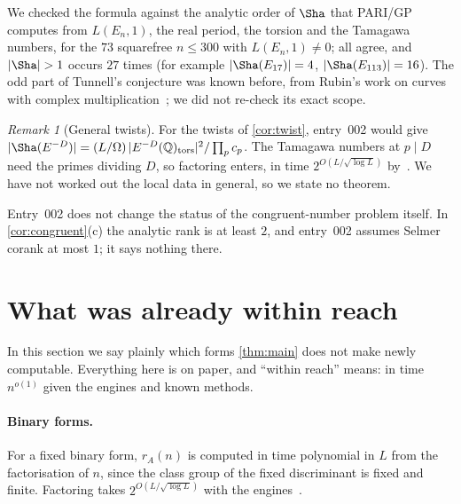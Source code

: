 \documentclass[10pt]{amsart}
\theoremstyle{plain}
\theoremstyle{definition}
\theoremstyle{remark}
\newtheorem{remark}[theorem]{Remark}
\numberwithin{equation}{section}
\newcommand{\Q}{\mathbb{Q}}
\newcommand{\rate}{2^{O(L/\sqrt{\log L})}}
\newcommand{\nr}{\dag}%
\begin{document}
\noindent We checked the formula against the analytic order of $\Sha$ that PARI/GP computes from
$L(E_n,1)$, the real period, the torsion and the Tamagawa numbers, for the $73$ squarefree $n\le300$ with
$L(E_n,1)\ne0$; all agree, and $|\Sha|>1$ occurs $27$ times (for example $|\Sha(E_{17})|=4$,
$|\Sha(E_{113})|=16$). The odd part of Tunnell's conjecture was known before, from Rubin's work on curves with
complex multiplication~\cite{Rub91}\nr; we did not re-check its exact scope.

\begin{remark}[General twists]
For the twists of \cref{cor:twist}, entry~002 would give $|\Sha(E^{-D})|=(L/\Omega)\,|E^{-D}(\Q)_{\mathrm{tors}}|^2/\prod_pc_p$.
The Tamagawa numbers at $p\mid D$ need the primes dividing $D$, so factoring enters, in time $\rate$
by~\cite{Shu26,TulFac26}. We have not worked out the local data in general, so we state no theorem.
\end{remark}

Entry~002 does not change the status of the congruent-number problem itself. In \cref{cor:congruent}(c) the
analytic rank is at least $2$, and entry~002 assumes Selmer corank at most $1$; it says nothing there.

\section{What was already within reach}\label{sec:new}

In this section we say plainly which forms \cref{thm:main} does not make newly computable. Everything here is
on paper, and ``within reach'' means: in time $n^{o(1)}$ given the engines and known methods.

\paragraph{Binary forms.} For a fixed binary form, $r_A(n)$ is computed in time polynomial in $L$ from the
factorisation of $n$, since the class group of the fixed discriminant is fixed and finite. Factoring takes
$\rate$ with the engines~\cite{RR26,Shu26,TulFac26}.
\end{document}
